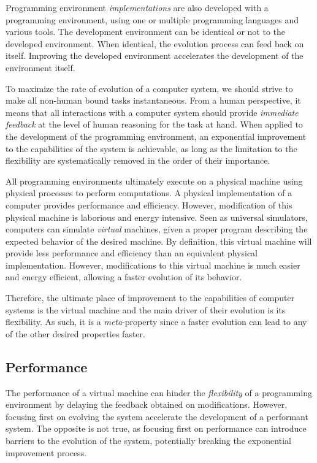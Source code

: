 Programming environment \textit{implementations} are also developed with a
programming environment, using one or multiple programming languages and
various tools. The development environment can be identical or not to the
developed environment.  When identical, the evolution process can feed back on
itself. Improving the developed environment accelerates the development of the
environment itself.  

To maximize the rate of evolution of a computer system, we should strive to
make all non-human bound tasks instantaneous. From a human perspective, it
means that all interactions with a computer system should provide
\textit{immediate feedback} at the level of human reasoning for the task at
hand. When applied to the development of the programming environment,
an exponential improvement to the capabilities of the system is achievable, as
long as the limitation to the flexibility are systematically removed in the
order of their importance.

All programming environments ultimately execute on a physical machine using
physical processes to perform computations. A physical implementation of a
computer provides performance and efficiency.  However, modification of this
physical machine is laborious and energy intensive. Seen as universal
simulators, computers can simulate \textit{virtual} machines, given a proper
program describing the expected behavior of the desired machine. By definition,
this virtual machine will provide less performance and efficiency than an
equivalent physical implementation. However, modifications to this virtual
machine is much easier and energy efficient, allowing a faster evolution of its
behavior. 

Therefore, the ultimate place of improvement to the capabilities of computer systems is 
the virtual machine and the main driver of their evolution is its flexibility.
As such, it is a \textit{meta}-property since a faster evolution can lead to
any of the other desired properties faster.

\subsection{Performance}
The performance of a virtual machine can hinder the \textit{flexibility} of a
programming environment by delaying the feedback obtained on modifications.
However, focusing first on evolving the system accelerate the development of a
performant system. The opposite is not true, as focusing first on performance
can introduce barriers to the evolution of the system, potentially breaking the
exponential improvement process.

